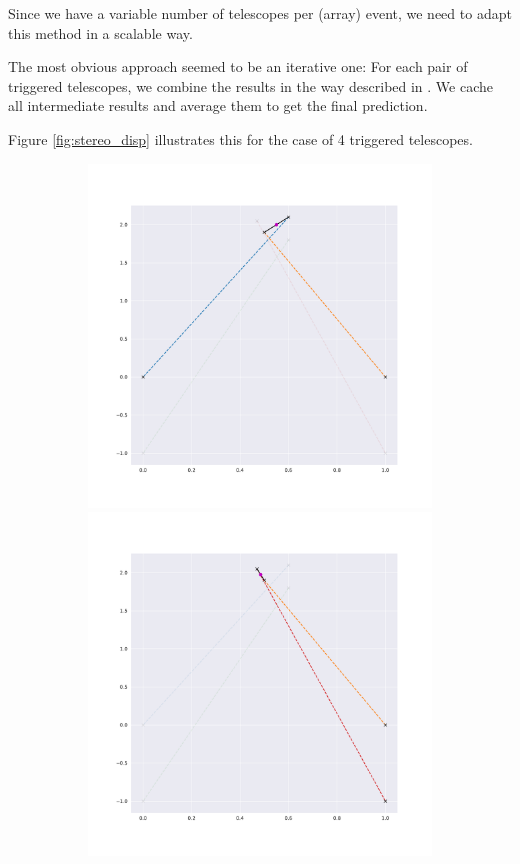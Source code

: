 Since we have a variable number of telescopes per (array) event,
we need to adapt this method in a scalable way.

The most obvious approach seemed to be an iterative one:
For each pair of triggered telescopes, we combine the results 
in the way described in \cite{disp magic paper}.
We cache all intermediate results and average them to get the final prediction.

Figure \ref{fig:stereo_disp} illustrates this for the case of 4 triggered telescopes.


\begin{figure}
    \begin{subfigure}{0.23\textwidth}
        \includegraphics[width=0.9\linewidth]{Plots/stereo_magic_1.pdf} 
        \includegraphics[width=0.9\linewidth]{Plots/stereo_magic_5.pdf} 

\end{subfigure}
\end{figure}
